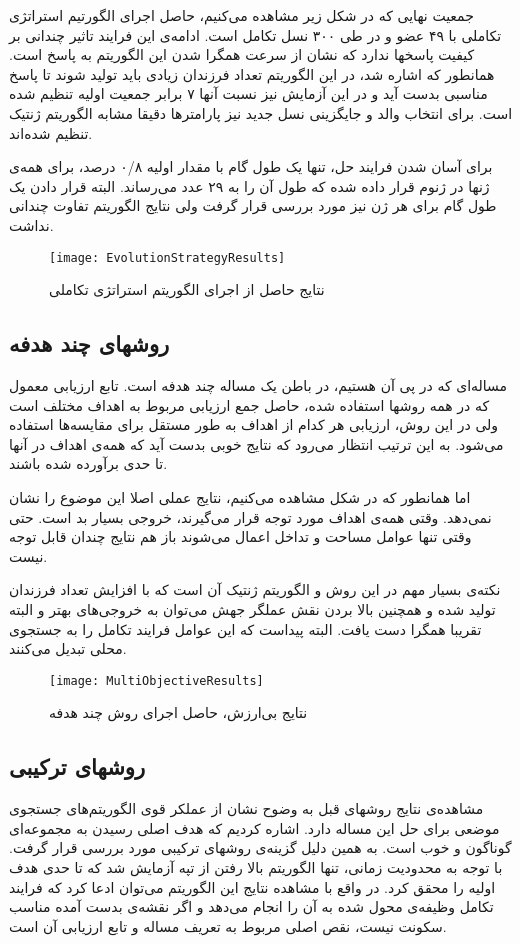 \documentclass{report}
\begin{document}
جمعیت نهایی که در شکل زیر مشاهده می‌کنیم، حاصل اجرای الگورتیم استراتژی تکاملی با ۴۹ عضو و در طی ۳۰۰ نسل تکامل است. ادامه‌ی این فرایند تاثیر چندانی بر کیفیت پاسخها ندارد که نشان از سرعت همگرا شدن این الگوریتم به پاسخ است. همانطور که اشاره شد، در این الگوریتم تعداد فرزندان زیادی باید تولید شوند تا پاسخ مناسبی بدست آید و در این آزمایش نیز نسبت آنها ۷ برابر جمعیت اولیه تنظیم شده است. برای انتخاب والد و جایگزینی نسل جدید نیز پارامترها دقیقا مشابه الگوریتم ژنتیک تنظیم شده‌اند.

 برای آسان شدن فرایند حل، تنها یک طول گام با مقدار اولیه ۰/۸ درصد، برای همه‌ی ژنها در ژنوم قرار داده شده که طول آن را به ۲۹ عدد می‌رساند. البته قرار دادن یک طول گام برای هر ژن نیز مورد بررسی قرار گرفت ولی نتایج الگوریتم تفاوت چندانی نداشت. 

\begin{figure} \centerline{\texttt{[image: EvolutionStrategyResults]}} \caption{\label{fEvolutionStrategyResults}
نتایج حاصل از اجرای الگوریتم استراتژی تکاملی
} \end{figure}

\subsection{روشهای چند هدفه}
مساله‌ای که در پی آن هستیم، در باطن یک مساله چند هدفه است. تابع ارزیابی معمول که در همه روشها استفاده شده، حاصل جمع ارزیابی مربوط به اهداف مختلف است ولی در این روش، ارزیابی هر کدام از اهداف به طور مستقل برای مقایسه‌ها استفاده می‌شود. به این ترتیب انتظار می‌رود که نتایج خوبی بدست آید که همه‌ی اهداف در آنها تا حدی برآورده شده باشند.

اما همانطور که در شکل مشاهده می‌کنیم، نتایج عملی اصلا این موضوع را نشان نمی‌دهد. وقتی همه‌ی اهداف مورد توجه قرار می‌گیرند، خروجی بسیار بد است. حتی وقتی تنها عوامل مساحت و تداخل اعمال می‌شوند باز هم نتایج چندان قابل توجه نیست.

نکته‌ی بسیار مهم در این روش و الگوریتم ژنتیک آن است که با افزایش تعداد فرزندان تولید شده و همچنین بالا بردن نقش عملگر جهش می‌توان به خروجی‌های بهتر و البته تقریبا همگرا دست یافت. البته پیداست که این عوامل فرایند تکامل را به جستجوی محلی تبدیل می‌کنند.

\begin{figure} \centerline{\texttt{[image: MultiObjectiveResults]}} \caption{\label{fMultiObjectiveResults}
نتایج بی‌ارزش، حاصل اجرای روش چند هدفه
} \end{figure}

\subsection{روشهای ترکیبی}
مشاهده‌ی نتایج روشهای قبل به وضوح نشان از عملکر قوی الگوریتم‌های جستجوی موضعی برای حل این مساله دارد. اشاره کردیم که هدف اصلی رسیدن به مجموعه‌ای گوناگون و خوب است. به همین دلیل گزینه‌ی روشهای ترکیبی مورد بررسی قرار گرفت. با توجه به محدودیت زمانی، تنها الگوریتم بالا رفتن از تپه آزمایش شد که تا حدی هدف اولیه را محقق کرد. در واقع با مشاهده نتایج این الگوریتم می‌توان ادعا کرد که فرایند تکامل وظیفه‌ی محول شده به آن را انجام می‌دهد و اگر نقشه‌ی بدست آمده مناسب سکونت نیست، نقص اصلی مربوط به تعریف مساله و تابع ارزیابی آن است.
\end{document}
